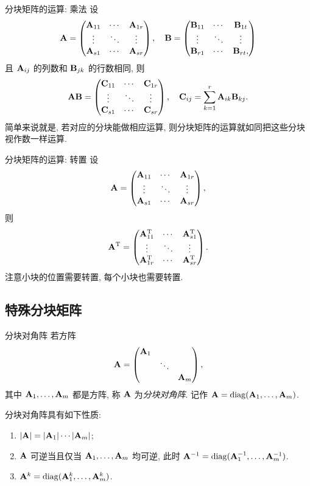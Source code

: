 \begin{frame}{分块矩阵的运算: 乘法}
	\onslide<+->
	设
	\[{\mathbf{A}}=\begin{pmatrix}
		{\mathbf{A}}_{11}&\cdots&{\mathbf{A}}_{1r}\\
		\vdots&\ddots&\vdots\\
		{\mathbf{A}}_{s1}&\cdots&{\mathbf{A}}_{sr}
	\end{pmatrix},\quad
	{\mathbf{B}}=\begin{pmatrix}
		{\mathbf{B}}_{11}&\cdots&{\mathbf{B}}_{1t}\\
		\vdots&\ddots&\vdots\\
		{\mathbf{B}}_{r1}&\cdots&{\mathbf{B}}_{rt},
	\end{pmatrix}\]
	且 ${\mathbf{A}}_{ij}$ 的列数和 ${\mathbf{B}}_{jk}$ 的行数相同, 则
	\[{\mathbf{A}}{\mathbf{B}}=\begin{pmatrix}
		{\mathbf{C}}_{11}&\cdots&{\mathbf{C}}_{1r}\\
		\vdots&\ddots&\vdots\\
		{\mathbf{C}}_{s1}&\cdots&{\mathbf{C}}_{sr}
	\end{pmatrix},\quad{\mathbf{C}}_{ij}=\sum_{k=1}^r {\mathbf{A}}_{ik}{\mathbf{B}}_{kj}.\]
	\onslide<+->
	简单来说就是, 若对应的分块能做相应运算, 则分块矩阵的运算就如同把这些分块视作数一样运算.
\end{frame}


\begin{frame}{分块矩阵的运算: 转置}
	\onslide<+->
	设
	\[{\mathbf{A}}=\begin{pmatrix}
		{\mathbf{A}}_{11}&\cdots&{\mathbf{A}}_{1r}\\
		\vdots&\ddots&\vdots\\
		{\mathbf{A}}_{s1}&\cdots&{\mathbf{A}}_{sr}
	\end{pmatrix},\]
	则
	\[{\mathbf{A}}^{\mathrm{T}}=\begin{pmatrix}
		{\mathbf{A}}_{11}^{\mathrm{T}}&\cdots&{\mathbf{A}}_{s1}^{\mathrm{T}}\\
		\vdots&\ddots&\vdots\\
		{\mathbf{A}}_{1r}^{\mathrm{T}}&\cdots&{\mathbf{A}}_{sr}^{\mathrm{T}}
	\end{pmatrix}.\]
	\onslide<+->
	注意小块的位置需要转置, 每个小块也需要转置.
\end{frame}


\subsection{特殊分块矩阵}
\begin{frame}{分块对角阵}
	\onslide<+->
	若方阵
	\[{\mathbf{A}}=\begin{pmatrix}
		{\mathbf{A}}_1&&\\
		&\ddots&\\
		&&{\mathbf{A}}_m
	\end{pmatrix},\]
	其中 ${\mathbf{A}}_1,\dots,{\mathbf{A}}_m$ 都是方阵,
	\onslide<+->
	称 ${\mathbf{A}}$ 为\emph{分块对角阵}.
	\onslide<+->
	记作 ${\mathbf{A}}={\mathrm{diag}}({\mathbf{A}}_1,\dots,{\mathbf{A}}_m)$.

	\onslide<+->
	分块对角阵具有如下性质:
	\begin{enumerate}
		\item $|{\mathbf{A}}|=|{\mathbf{A}}_1|\cdots|{\mathbf{A}}_m|$;
		\item ${\mathbf{A}}$ 可逆当且仅当 ${\mathbf{A}}_1,\dots,{\mathbf{A}}_m$ 均可逆, 此时
		${\mathbf{A}}^{-1}={\mathrm{diag}}({\mathbf{A}}_1^{-1},\dots,{\mathbf{A}}_m^{-1})$.
		\item ${\mathbf{A}}^k={\mathrm{diag}}({\mathbf{A}}_1^k,\dots,{\mathbf{A}}_m^k)$.
	\end{enumerate}
\end{frame}


